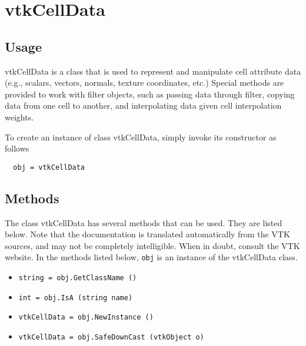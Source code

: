 \section{vtkCellData}

\subsection{Usage}

 vtkCellData is a class that is used to represent and manipulate
 cell attribute data (e.g., scalars, vectors, normals, texture 
 coordinates, etc.) Special methods are provided to work with filter
 objects, such as passing data through filter, copying data from one 
 cell to another, and interpolating data given cell interpolation weights.

To create an instance of class vtkCellData, simply
invoke its constructor as follows
\begin{verbatim}
  obj = vtkCellData
\end{verbatim}
\subsection{Methods}

The class vtkCellData has several methods that can be used.
  They are listed below.
Note that the documentation is translated automatically from the VTK sources,
and may not be completely intelligible.  When in doubt, consult the VTK website.
In the methods listed below, \verb|obj| is an instance of the vtkCellData class.
\begin{itemize}
\item  \verb|string = obj.GetClassName ()|

\item  \verb|int = obj.IsA (string name)|

\item  \verb|vtkCellData = obj.NewInstance ()|

\item  \verb|vtkCellData = obj.SafeDownCast (vtkObject o)|

\end{itemize}

